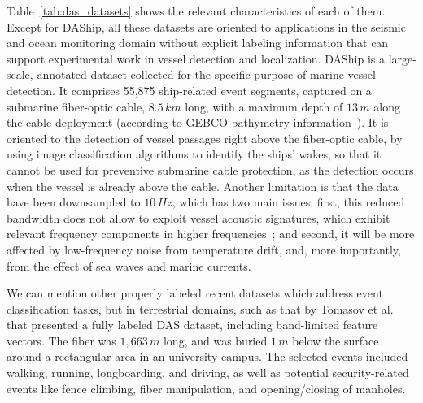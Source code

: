 \documentclass[11pt]{article}
\begin{document}
Table~\ref{tab:das_datasets} shows the relevant characteristics of each of them. Except for DAShip, all these datasets are oriented to applications in the seismic and ocean monitoring domain without explicit labeling information that can support experimental work in vessel detection and localization. DAShip is a large-scale, annotated dataset collected for the specific purpose of marine vessel detection. It comprises 55,875 ship-related event segments, captured on a submarine fiber-optic cable, $8.5\,km$ long, with a maximum depth of $13\,m$ along the cable deployment (according to GEBCO bathymetry information~\cite{gebco2024}). It is oriented to the detection of vessel passages right above the fiber-optic cable, by using image classification algorithms to identify the ships' wakes, so that it cannot be used for preventive submarine cable protection, as the detection occurs when the vessel is already above the cable. Another limitation is that the data have been downsampled to $10\,Hz$, which has two main issues: first, this reduced bandwidth does not allow to exploit vessel acoustic signatures, which exhibit relevant frequency components in higher frequencies~\cite{Rivet_2021,Thiem_2023}; and second, it will be more affected by low-frequency noise from temperature drift, and, more importantly, from the effect of sea waves and marine currents.

We can mention other properly labeled recent datasets which address event classification tasks, but in terrestrial domains, such as that by Tomasov et al.~\cite{tomasov2025comprehensive} that presented a fully labeled DAS dataset, including band-limited feature vectors. The fiber was $1{,}663\,m$ long, and was buried $1\,m$ below the surface around a rectangular area in an university campus. The selected events included walking, running, longboarding, and driving, as well as potential security-related events like fence climbing, fiber manipulation, and opening/closing of manholes.
\end{document}
